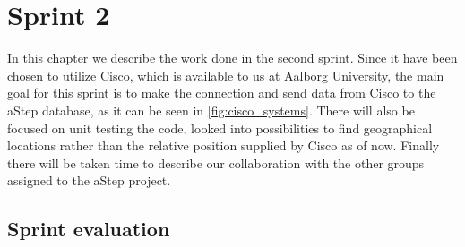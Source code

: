 \chapter{Sprint 2}
In this chapter we describe the work done in the second sprint. Since it have been chosen to utilize Cisco, which is available to us at Aalborg University, the main goal for this sprint is to make the connection and send data from Cisco to the aStep database, as it can be seen in \cref{fig:cisco_systems}. There will also be focused on unit testing the code, looked into possibilities to find geographical locations rather than the relative position supplied by Cisco as of now. Finally there will be taken time to describe our collaboration with the other groups assigned to the aStep project.





\section{Sprint evaluation}